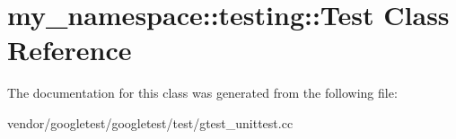 \hypertarget{classmy__namespace_1_1testing_1_1_test}{}\section{my\+\_\+namespace\+:\+:testing\+:\+:Test Class Reference}
\label{classmy__namespace_1_1testing_1_1_test}


The documentation for this class was generated from the following file\+:\begin{DoxyCompactItemize}
\item 
vendor/googletest/googletest/test/gtest\+\_\+unittest.\+cc\end{DoxyCompactItemize}
